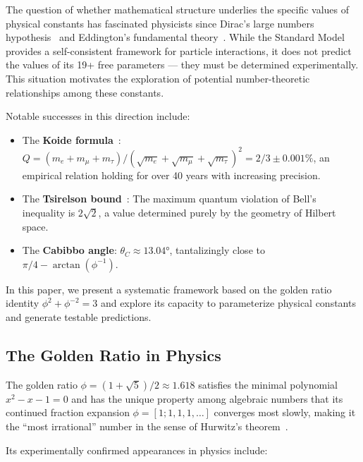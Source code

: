 \documentclass[aps,prd,preprint,superscriptaddress,showpacs,nofootinbib,longbibliography]{revtex4-2}
\begin{document}
The question of whether mathematical structure underlies the specific values of physical constants has fascinated physicists since Dirac's large numbers hypothesis~\cite{dirac1937} and Eddington's fundamental theory~\cite{eddington1946}. While the Standard Model provides a self-consistent framework for particle interactions, it does not predict the values of its 19+ free parameters --- they must be determined experimentally. This situation motivates the exploration of potential number-theoretic relationships among these constants.

Notable successes in this direction include:
\begin{itemize}[itemsep=2pt]
    \item The \textbf{Koide formula}~\cite{koide1983,koide2007}: $Q = (m_e + m_\mu + m_\tau)/(\sqrt{m_e} + \sqrt{m_\mu} + \sqrt{m_\tau})^2 = 2/3 \pm 0.001\%$, an empirical relation holding for over 40 years with increasing precision.
    \item The \textbf{Tsirelson bound}~\cite{tsirelson1980}: The maximum quantum violation of Bell's inequality is $2\sqrt{2}$, a value determined purely by the geometry of Hilbert space.
    \item The \textbf{Cabibbo angle}: $\theta_C \approx 13.04°$, tantalizingly close to $\pi/4 - \arctan(\phi^{-1})$.
\end{itemize}

In this paper, we present a systematic framework based on the golden ratio identity $\phi^2 + \phi^{-2} = 3$ and explore its capacity to parameterize physical constants and generate testable predictions.

\subsection{The Golden Ratio in Physics}
\label{sec:phi_physics}

The golden ratio $\phi = (1+\sqrt{5})/2 \approx 1.618$ satisfies the minimal polynomial $x^2 - x - 1 = 0$ and has the unique property among algebraic numbers that its continued fraction expansion $\phi = [1; 1, 1, 1, \ldots]$ converges most slowly, making it the ``most irrational'' number in the sense of Hurwitz's theorem~\cite{khinchin1964}.

Its experimentally confirmed appearances in physics include:
\end{document}

